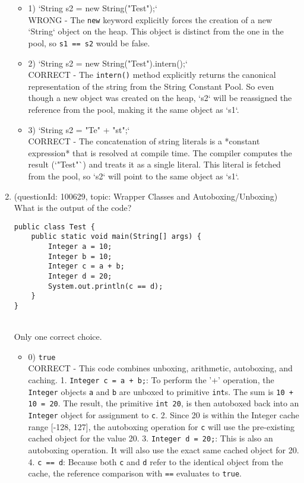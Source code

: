 \documentclass[12pt]{article}
\begin{document}
\begin{enumerate}[label=(\arabic*)]
\begin{itemize}
\item 1) `String s2 = new String("Test");`
 \\ 
WRONG - The \verb|new| keyword explicitly forces the creation of a new `String` object on the heap. This object is distinct from the one in the pool, so \verb|s1 == s2| would be false.

\item 2) `String s2 = new String("Test").intern();`
 \\ 
CORRECT - The \verb|intern()| method explicitly returns the canonical representation of the string from the String Constant Pool. So even though a new object was created on the heap, `s2` will be reassigned the reference from the pool, making it the same object as `s1`.

\item 3) `String s2 = "Te" + "st";`
 \\ 
CORRECT - The concatenation of string literals is a *constant expression* that is resolved at compile time. The compiler computes the result (`"Test"`) and treats it as a single literal. This literal is fetched from the pool, so `s2` will point to the same object as `s1`.

\end{itemize}
\item (questionId: 100629, topic: Wrapper Classes and Autoboxing/Unboxing) \\ 
What is the output of the code?\n\begin{verbatim}
public class Test {
    public static void main(String[] args) {
        Integer a = 10;
        Integer b = 10;
        Integer c = a + b;
        Integer d = 20;
        System.out.println(c == d);
    }
}
\end{verbatim}
\\ \noindent Only one correct choice. 
\begin{itemize}
\item 0) \verb|true|
 \\ 
CORRECT - This code combines unboxing, arithmetic, autoboxing, and caching. 
1. \verb|Integer c = a + b;|: To perform the '+' operation, the \verb|Integer| objects \verb|a| and \verb|b| are unboxed to primitive \verb|int|s. The sum is \verb|10 + 10 = 20|. The result, the primitive \verb|int 20|, is then autoboxed back into an \verb|Integer| object for assignment to \verb|c|.
2. Since 20 is within the Integer cache range [-128, 127], the autoboxing operation for \verb|c| will use the pre-existing cached object for the value 20.
3. \verb|Integer d = 20;|: This is also an autoboxing operation. It will also use the exact same cached object for 20.
4. \verb|c == d|: Because both \verb|c| and \verb|d| refer to the identical object from the cache, the reference comparison with \verb|==| evaluates to \verb|true|.


\end{itemize}
\end{enumerate}
\end{document}
